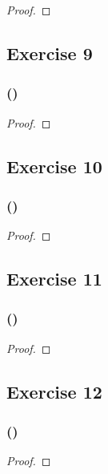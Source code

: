 \documentclass[14pt]{extarticle}
\begin{document}
\begin{proof}

\end{proof}

\subsection{Exercise 9}

\subsubsection{()}

\begin{proof}

\end{proof}

\subsection{Exercise 10}

\subsubsection{()}

\begin{proof}

\end{proof}

\subsection{Exercise 11}

\subsubsection{()}

\begin{proof}

\end{proof}

\subsection{Exercise 12}

\subsubsection{()}

\begin{proof}

\end{proof}
\end{document}
